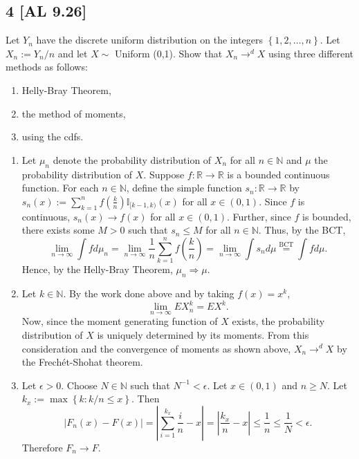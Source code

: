 \documentclass[12pt]{article}
\begin{document}
\subsection*{4 [AL 9.26]}
\begin{tcolorbox}
Let $Y_n$ have the discrete uniform distribution on the integers $\left\{ 1,2,\hdots, n \right\}$. Let $X_n := Y_n / n$ and let $X \sim$ Uniform (0,1).
Show that $X_n \rightarrow^{d} X$ using three different methods as follows:
\begin{enumerate}[label = (\alph*)]
\item Helly-Bray Theorem,
\item the method of moments,
\item using the cdfs.
\end{enumerate}
\end{tcolorbox}
\begin{enumerate}[label = (\alph*)]
\item Let $\mu_n$ denote the probability distribution of $X_n$ for all $n \in \mathbb{N}$ and $\mu$ the probability distribution of $X$.
Suppose $f : \mathbb{R} \rightarrow \mathbb{R}$ is a bounded continuous function. For each $n \in \mathbb{N}$, define the simple function $s_n :
\mathbb{R} \rightarrow \mathbb{R}$ by $s_n(x) := \sum_{k=1}^{n}f\left( \frac{k}{n} \right)\mathbb{I}_{[k-1,k)}(x)$ for all $x \in (0,1)$. Since $f$ is continuous,
$s_n(x) \rightarrow f(x)$ for all $x \in (0,1)$. Further, since $f$ is bounded, there exists some $M > 0$ such that $s_n \leq M$ for all $n \in
\mathbb{N}$. Thus, by the BCT,
\[ \lim_{n\rightarrow\infty}\int f d\mu_n = \lim_{n\rightarrow\infty}\frac{1}{n}\sum_{k=1}^{n}f\left( \frac{k}{n} \right) =
\lim_{n\rightarrow\infty}\int s_n d\mu \stackrel{\text{BCT}}{=} \int fd\mu. \]
Hence, by the Helly-Bray Theorem, $\mu_n \Rightarrow \mu$.
\item Let $k \in \mathbb{N}$. By the work done above and by taking $f(x) = x^{k}$,
\[ \lim_{n\rightarrow\infty}EX_n^{k} = EX^{k}. \]
Now, since the moment generating function of $X$ exists, the probability distribution of $X$ is uniquely determined by its moments. From this
consideration and the convergence of moments as shown above, $X_n \rightarrow^{d} X$ by the Frech\'{e}t-Shohat theorem.
\item Let $\epsilon > 0$. Choose $N \in \mathbb{N}$ such that $N^{-1} < \epsilon$. Let $x \in (0,1)$ and $n \geq N$. Let $k_x := \max\left\{ k :
k/n \leq x\right\}$. Then
\[ |F_n(x) - F(x)| = \left| \sum_{i=1}^{k_x}\frac{i}{n} - x\right| = \left| \frac{k_x}{n} - x\right| \leq \frac{1}{n} \leq \frac{1}{N} < \epsilon. \]
Therefore $F_n \rightarrow F$.
\end{enumerate}
\end{document}
